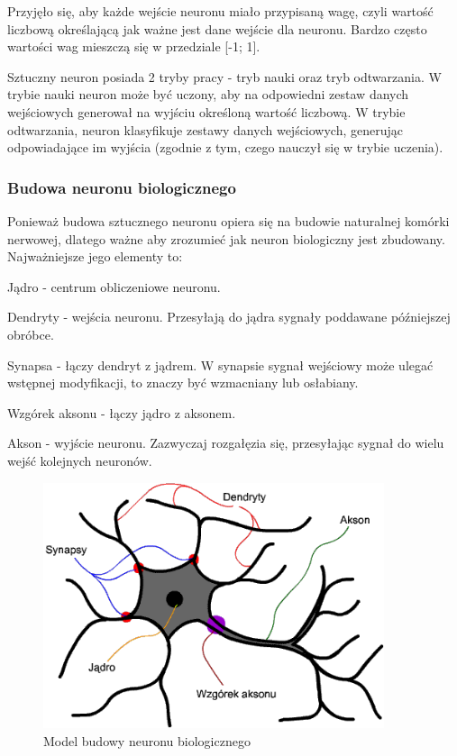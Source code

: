 Przyjęło się, aby każde wejście neuronu miało przypisaną wagę, czyli wartość liczbową określającą jak ważne jest dane wejście dla neuronu.
Bardzo często wartości wag mieszczą się w przedziale [-1; 1].

Sztuczny neuron posiada 2 tryby pracy - tryb nauki oraz tryb odtwarzania. \newline
W trybie nauki neuron może być uczony, aby na odpowiedni zestaw danych
wejściowych generował na wyjściu określoną wartość liczbową. \newline
W trybie odtwarzania, neuron klasyfikuje zestawy danych wejściowych, generując
odpowiadające im wyjścia (zgodnie z tym, czego nauczył się w trybie uczenia).

\subsubsection{Budowa neuronu biologicznego}
Ponieważ budowa sztucznego neuronu opiera się na budowie naturalnej komórki nerwowej, dlatego ważne aby zrozumieć jak neuron biologiczny jest zbudowany. \\
Najważniejsze jego elementy to:
\begin{itemize*}
\item Jądro - centrum obliczeniowe neuronu.
\item Dendryty - wejścia neuronu. Przesyłają do jądra sygnały poddawane późniejszej obróbce.
\item Synapsa - łączy dendryt z jądrem. W synapsie sygnał wejściowy może ulegać wstępnej modyfikacji, to znaczy być wzmacniany lub osłabiany.
\item Wzgórek aksonu - łączy jądro z aksonem.
\item Akson - wyjście neuronu. Zazwyczaj rozgałęzia się, przesyłając sygnał do wielu wejść kolejnych neuronów.
\end{itemize*}

\begin{figure}[h]
\begin{center}
\includegraphics[width=10cm]{resources/figures/natural_neuron.png}
\caption{Model budowy neuronu biologicznego}
\end{center}
\end{figure}

